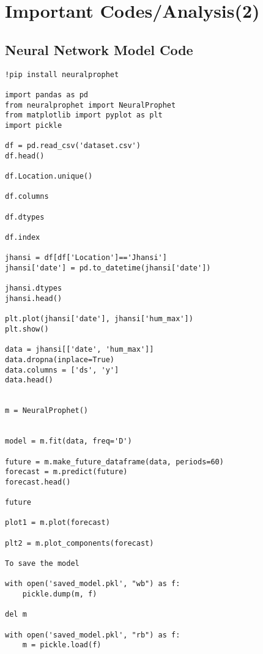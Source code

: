 \chapter{Important Codes/Analysis(2)}
\section{Neural Network Model Code}
\lstset{language=Python}
\lstset{frame=lines}
\lstset{basicstyle=\footnotesize}
\begin{lstlisting}
!pip install neuralprophet

import pandas as pd
from neuralprophet import NeuralProphet
from matplotlib import pyplot as plt
import pickle

df = pd.read_csv('dataset.csv')
df.head()

df.Location.unique()

df.columns

df.dtypes

df.index

jhansi = df[df['Location']=='Jhansi']
jhansi['date'] = pd.to_datetime(jhansi['date'])

jhansi.dtypes
jhansi.head()

plt.plot(jhansi['date'], jhansi['hum_max'])
plt.show()

data = jhansi[['date', 'hum_max']]
data.dropna(inplace=True)
data.columns = ['ds', 'y']
data.head()

  
m = NeuralProphet()

                                
model = m.fit(data, freq='D')

future = m.make_future_dataframe(data, periods=60)
forecast = m.predict(future)
forecast.head()

future

plot1 = m.plot(forecast)

plt2 = m.plot_components(forecast)

To save the model

with open('saved_model.pkl', "wb") as f:
    pickle.dump(m, f)

del m

with open('saved_model.pkl', "rb") as f:
    m = pickle.load(f)


\end{lstlisting}
